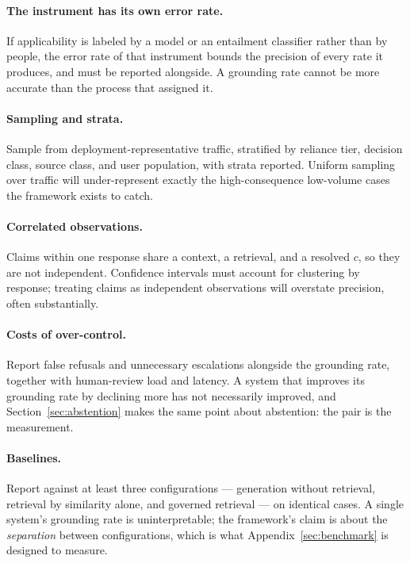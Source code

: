 \paragraph{The instrument has its own error rate.} If applicability is labeled by a
model or an entailment classifier rather than by people, the error rate of that
instrument bounds the precision of every rate it produces, and must be reported
alongside. A grounding rate cannot be more accurate than the process that assigned it.

\paragraph{Sampling and strata.} Sample from deployment-representative traffic, stratified
by reliance tier, decision class, source class, and user population, with strata
reported. Uniform sampling over traffic will under-represent exactly the
high-consequence low-volume cases the framework exists to catch.

\paragraph{Correlated observations.} Claims within one response share a context, a
retrieval, and a resolved $c$, so they are not independent. Confidence intervals must
account for clustering by response; treating claims as independent observations will
overstate precision, often substantially.

\paragraph{Costs of over-control.} Report false refusals and unnecessary escalations
alongside the grounding rate, together with human-review load and latency. A system that
improves its grounding rate by declining more has not necessarily improved, and
Section~\ref{sec:abstention} makes the same point about abstention: the pair is the
measurement.

\paragraph{Baselines.} Report against at least three configurations --- generation
without retrieval, retrieval by similarity alone, and governed retrieval --- on identical
cases. A single system's grounding rate is uninterpretable; the framework's claim is
about the \emph{separation} between configurations, which is what
Appendix~\ref{sec:benchmark} is designed to measure.

